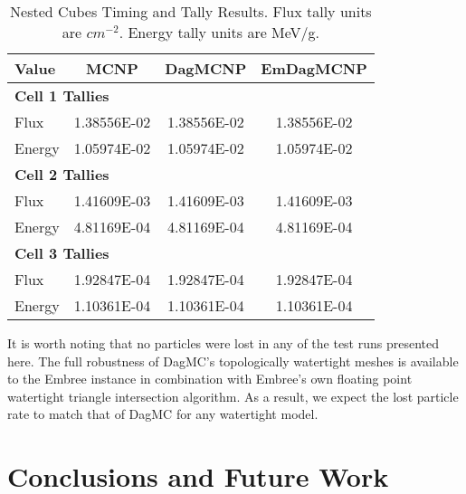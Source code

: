 \documentclass{anstrans}
\begin{document}
\begin{table}
  \small
  \begin{center}
    \caption{Nested Cubes Timing and Tally Results. Flux tally units are $cm^{-2}$. Energy tally units are MeV/g.  }
    \label{nestedcubes}
    \begin{tabular}{lccc}
      \toprule
      Value & MCNP & DagMCNP & EmDagMCNP \\
      \toprule
      \multicolumn{4}{l}{\textbf{Cell 1 Tallies}} \\
      \hline
      Flux  & 1.38556E-02 & 1.38556E-02 & 1.38556E-02 \\
      Energy  & 1.05974E-02 & 1.05974E-02 & 1.05974E-02 \\
      \hline
      \multicolumn{4}{l}{\textbf{Cell 2 Tallies}} \\
      \hline
      Flux  & 1.41609E-03 & 1.41609E-03 & 1.41609E-03 \\
      Energy  & 4.81169E-04 & 4.81169E-04 & 4.81169E-04 \\
      \hline
      \multicolumn{4}{l}{\textbf{Cell 3 Tallies}} \\
      \hline
      Flux  & 1.92847E-04 & 1.92847E-04 & 1.92847E-04 \\
      Energy  & 1.10361E-04 & 1.10361E-04 & 1.10361E-04 \\
      \bottomrule
      
                        
    \end{tabular}


  \end{center}
\end{table}

It is worth noting that no particles were lost in any of the test runs presented here. The full robustness of DagMC's topologically watertight meshes is available to the Embree instance in combination with Embree's own floating point watertight triangle intersection algorithm.  \cite{make_watertight_smith_2010} \cite{watertight_tri_intersection_woop_2013} As a result, we expect the lost particle rate to match that of DagMC for any watertight model. 

\section{Conclusions and Future Work}
\end{document}
